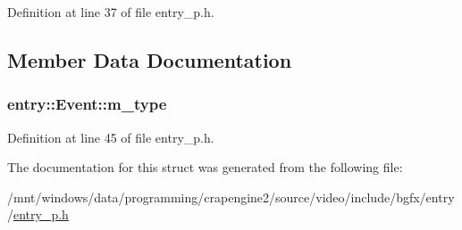 Definition at line 37 of file entry\+\_\+p.\+h.



\subsection{Member Data Documentation}
\hypertarget{structentry_1_1_event_a1b1605fe09ef2a4cd5e49be227776700}{
\subsubsection[{m\+\_\+type}]{ entry\+::\+Event\+::m\+\_\+type}}\label{structentry_1_1_event_a1b1605fe09ef2a4cd5e49be227776700}


Definition at line 45 of file entry\+\_\+p.\+h.



The documentation for this struct was generated from the following file\+:\begin{DoxyCompactItemize}
\item 
/mnt/windows/data/programming/crapengine2/source/video/include/bgfx/entry/\hyperlink{entry__p_8h}{entry\+\_\+p.\+h}\end{DoxyCompactItemize}
